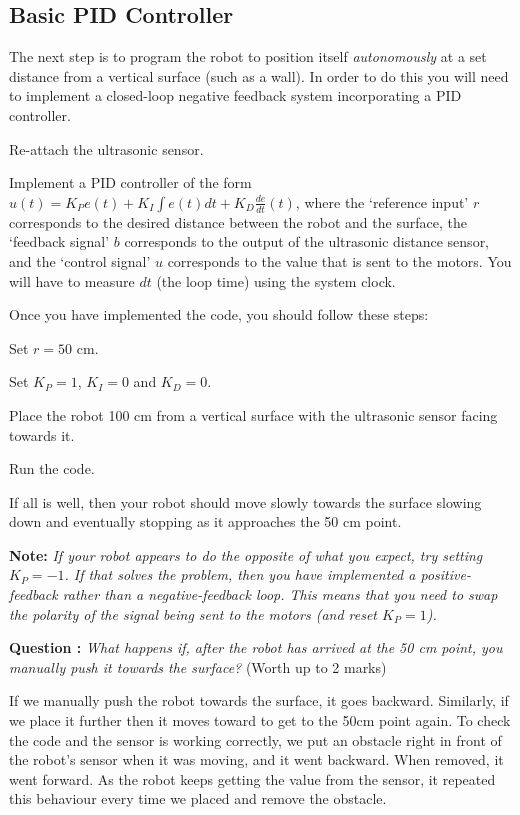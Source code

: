 \documentclass[hidelinks,a4paper,11pt]{article}
\newcounter{question}
\newcommand\myq{\refstepcounter{question}\thequestion}
\begin{document}
	
	\subsection{Basic PID Controller}
	
	The next step is to program the robot to position itself \emph{autonomously} at a set distance from a vertical surface (such as a wall).  In order to do this you will need to implement a closed-loop negative feedback system incorporating a PID controller.
	
	\begin{todolist}
		\item Re-attach the ultrasonic sensor.
		\item Implement a PID controller of the form $u(t) = K_P e(t) + K_I \int e(t)dt + K_D \frac{de}{dt}(t)$, where the `reference input' $r$ corresponds to the desired distance between the robot and the surface, the `feedback signal' $b$ corresponds to the output of the ultrasonic distance sensor, and the `control signal' $u$ corresponds to the value that is sent to the motors.  You will have to measure $dt$ (the loop time) using the system clock.
	\end{todolist}
	
	Once you have implemented the code, you should follow these steps:
	\begin{todolist}
		\item Set $r=50$ cm.
		\item Set $K_P=1$, $K_I=0$ and $K_D=0$.
		\item Place the robot 100 cm from a vertical surface with the ultrasonic sensor facing towards it.
		\item Run the code.
	\end{todolist}
	
	If all is well, then your robot should move slowly towards the surface slowing down and eventually stopping as it approaches the 50 cm point.
	
	{\bfseries Note:}  \emph{If your robot appears to do the opposite of what you expect, try setting $K_P=-1$.  If that solves the problem, then you have implemented a positive-feedback rather than a negative-feedback loop.  This means that you need to swap the polarity of the signal being sent to the motors (and reset $K_P=1$).}
	
	{\bfseries Question \myq:}  \emph{What happens if, after the robot has arrived at the 50 cm point, you manually push it towards the surface?} (Worth up to 2 marks)\\
	\begin{mdframed}
		If we manually push the robot towards the surface, it goes backward. Similarly, if we place it further then it moves toward to get to the 50cm point again. To check the code and the sensor is working correctly, we put an obstacle right in front of the robot’s sensor when it was moving, and it went backward. When removed, it went forward. As the robot keeps getting the value from the sensor, it repeated this behaviour every time we placed and remove the obstacle.
	\end{mdframed}
	\vspace*{\baselineskip}
	
\end{document}
